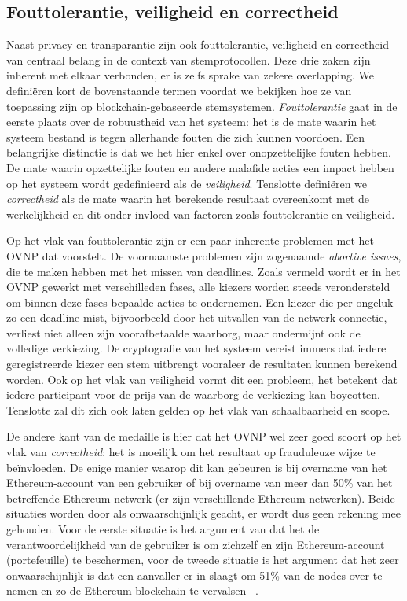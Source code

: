 	\subsection{Fouttolerantie, veiligheid en correctheid}
	
	Naast privacy en transparantie zijn ook fouttolerantie, veiligheid en correctheid van centraal belang in de context van stemprotocollen. Deze drie zaken zijn inherent met elkaar verbonden, er is zelfs sprake van zekere overlapping. We definiëren kort de bovenstaande termen voordat we bekijken hoe ze van toepassing zijn op blockchain-gebaseerde stemsystemen. \textit{Fouttolerantie} gaat in de eerste plaats over de robuustheid van het systeem: het is de mate waarin het systeem bestand is tegen allerhande fouten die zich kunnen voordoen. Een belangrijke distinctie is dat we het hier enkel over onopzettelijke fouten hebben. De mate waarin opzettelijke fouten en andere malafide acties een impact hebben op het systeem wordt gedefinieerd als de \textit{veiligheid}. Tenslotte definiëren we \textit{correctheid} als de mate waarin het berekende resultaat overeenkomt met de werkelijkheid en dit onder invloed van factoren zoals fouttolerantie en veiligheid.
	
	Op het vlak van fouttolerantie zijn er een paar inherente problemen met het OVNP dat \textcite{McCorry2017} voorstelt. De voornaamste problemen zijn zogenaamde \textit{abortive issues}, die te maken hebben met het missen van deadlines. Zoals vermeld wordt er in het OVNP gewerkt met verschilleden fases, alle kiezers worden steeds verondersteld om binnen deze fases bepaalde acties te ondernemen. Een kiezer die per ongeluk zo een deadline mist, bijvoorbeeld door het uitvallen van de netwerk-connectie, verliest niet alleen zijn voorafbetaalde waarborg, maar ondermijnt ook de volledige verkiezing. De cryptografie van het systeem vereist immers dat iedere geregistreerde kiezer een stem uitbrengt vooraleer de resultaten kunnen berekend worden. Ook op het vlak van veiligheid vormt dit een probleem, het betekent dat iedere participant voor de prijs van de waarborg de verkiezing kan boycotten. Tenslotte zal dit zich ook laten gelden op het vlak van schaalbaarheid en scope. 
	
	De andere kant van de medaille is hier dat het OVNP wel zeer goed scoort op het vlak van \textit{correctheid}: het is moeilijk om het resultaat op frauduleuze wijze te beïnvloeden. De enige manier waarop dit kan gebeuren is bij overname van het Ethereum-account van een gebruiker of bij overname van meer dan 50\% van het betreffende Ethereum-netwerk (er zijn verschillende Ethereum-netwerken). Beide situaties worden door \textcite{McCorry2017} als onwaarschijnlijk geacht, er wordt dus geen rekening mee gehouden. Voor de eerste situatie is het argument van \textcite{McCorry2017} dat het de verantwoordelijkheid van de gebruiker is om zichzelf en zijn Ethereum-account (portefeuille) te beschermen, voor de tweede situatie is het argument dat het zeer onwaarschijnlijk is dat een aanvaller er in slaagt om 51\% van de nodes over te nemen en zo de Ethereum-blockchain te vervalsen ~\autocite{McCorry2017}.
	
